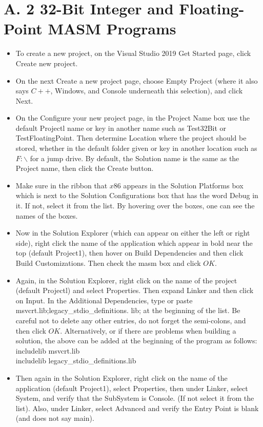 \documentclass[10pt]{article}
\begin{document}
\section*{A. 2 32-Bit Integer and Floating-Point MASM Programs}
\begin{itemize}
  \item To create a new project, on the Visual Studio 2019 Get Started page, click Create new project.
  \item On the next Create a new project page, choose Empty Project (where it also says $C++$, Windows, and Console underneath this selection), and click Next.
  \item On the Configure your new project page, in the Project Name box use the default Projectl name or key in another name such as Test32Bit or TestFloatingPoint. Then determine Location where the project should be stored, whether in the default folder given or key in another location such as $F: \backslash$ for a jump drive. By default, the Solution name is the same as the Project name, then click the Create button.
  \item Make sure in the ribbon that $x 86$ appears in the Solution Platforms box which is next to the Solution Configurations box that has the word Debug in it. If not, select it from the list. By hovering over the boxes, one can see the names of the boxes.
  \item Now in the Solution Explorer (which can appear on either the left or right side), right click the name of the application which appear in bold near the top (default Project1), then hover on Build Dependencies and then click Build Customizations. Then check the masm box and click $O K$.
  \item Again, in the Solution Explorer, right click on the name of the project (default Projectl) and select Properties. Then expand Linker and then click on Input. In the Additional Dependencies, type or paste msvcrt.lib;legacy\_stdio\_definitions. lib; at the beginning of the list. Be careful not to delete any other entries, do not forget the semi-colons, and then click $O K$. Alternatively, or if there are problems when building a solution, the above can be added at the beginning of the program as follows:\\
includelib msvcrt.lib\\
includelib legacy\_stdio\_definitions.lib
  \item Then again in the Solution Explorer, right click on the name of the application (default Project1), select Properties, then under Linker, select System, and verify that the SubSystem is Console. (If not select it from the list). Also, under Linker, select Advanced and verify the Entry Point is blank (and does not say main).

\end{itemize}
\end{document}

